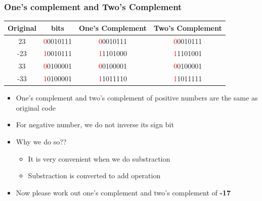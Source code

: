 \begin{frame}
	\frametitle{One's complement and Two's Complement}
\begin{table}
\begin{center}
\begin{tabular}{|c|c|c|c|}
\hline
Original & bits & One's Complement & Two's Complement \\ \hline
23   & \textcolor{red}{0}0010111 & \textcolor{red}{0}0010111 & \textcolor{red}{0}0010111 \\ \hline 
-23   & \textcolor{red}{1}0010111 & \textcolor{red}{1}1101000 & \textcolor{red}{1}1101001 \\ \hline \hline
33   & \textcolor{red}{0}0100001 & \textcolor{red}{0}0100001 & \textcolor{red}{0}0100001 \\ \hline
-33   & \textcolor{red}{1}0100001 & \textcolor{red}{1}1011110 & \textcolor{red}{1}1011111 \\ \hline  
\end{tabular}
\end{center}
\end{table}
\begin{itemize}
	\item {One's complement and two's complement of positive numbers are the same as original code}
	\item {For negative number, we do not inverse its sign bit}
	\item {Why we do so??}
	\begin{itemize}
		\item {It is very convenient when we do substraction}
		\item {Substraction is converted to add operation}
	\end{itemize}
	\item {Now please work out one's complement and two's complement of \textbf{-17}}
\end{itemize}
\end{frame}